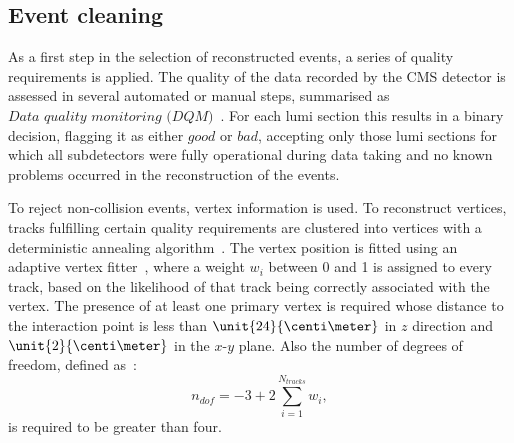 \subsection{Event cleaning}
As a first step in the selection of reconstructed events, a series of quality requirements is applied. 
The quality of the data recorded by the CMS detector is assessed in several automated or manual steps, summarised as $\textit{Data quality monitoring (DQM)}$~\cite{DQM}. For each lumi section this results in a binary decision, flagging it as either $\textit{good}$ or $\textit{bad}$, accepting only those lumi sections for which all subdetectors were fully operational during data taking and no known problems occurred in the reconstruction of the events.

To reject non-collision events, vertex information is used. To reconstruct vertices, tracks fulfilling certain quality requirements are clustered into vertices with a deterministic annealing algorithm~\cite{DertermisiticAnnealing,Chatrchyan:2014fea}. The vertex position is fitted using an adaptive vertex fitter~\cite{Fruehwirth:1027031}, where a weight $w_i$ between 0 and 1 is assigned to every track, based on the likelihood of that track being correctly associated with the vertex. The presence of at least one primary vertex is required whose distance to the interaction point is less than $\unit{24}{\centi\meter}$ in $z$ direction and $\unit{2}{\centi\meter}$ in the $x$-$y$ plane. Also the number of degrees of freedom, defined as~\cite{Chatrchyan:2014fea}:
\begin{equation}
n_{dof} = -3 + 2 \sum\limits_{i=1}^{N_{tracks}} w_i,
\end{equation}
is required to be greater than four.  

